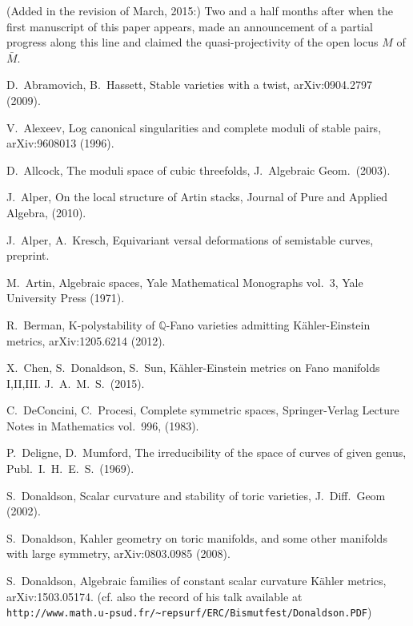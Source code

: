 \documentclass[12pt]{amsart}
\theoremstyle{remark}
\theoremstyle{definition}
\begin{document}
(Added in the revision of March, 2015:) Two and a half 
months after when the first manuscript of this paper 
appears, \cite{LWX2} made an announcement of a partial 
progress along this line and 
claimed the quasi-projectivity of the open locus $M$ of $\bar{M}$. 

\begin{thebibliography}{FGA}

D.~Abramovich, B.~Hassett, 
Stable varieties with a twist, arXiv:0904.2797 (2009). 

V.~Alexeev, Log canonical singularities and complete moduli of stable pairs, 
arXiv:9608013 (1996). 

D.~Allcock, 
The moduli space of cubic threefolds, 
J.\ Algebraic Geom.\ 
(2003). 

J.~Alper, On the local structure of Artin stacks, Journal of Pure and Applied Algebra, 
(2010). 

J.~Alper, A.~Kresch, 
Equivariant versal deformations of semistable curves, 
preprint. 

M.~Artin, Algebraic spaces, 
Yale Mathematical Monographs vol.\ 3, 
Yale University Press (1971). 

R.~Berman, 
K-polystability of $\mathbb{Q}$-Fano varieties admitting 
K\"ahler-Einstein metrics, arXiv:1205.6214 (2012). 

X.~Chen, S.~Donaldson, S.~Sun, 
K\"ahler-Einstein metrics on Fano manifolds I,II,III. 
J.\ A.\ M.\ S.\ (2015). 

C.~DeConcini, C.~Procesi, 
Complete symmetric spaces, Springer-Verlag Lecture Notes in 
Mathematics vol.\ 996, (1983). 

P.~Deligne, D.~Mumford, 
The irreducibility of the space of curves of given genus, 
Publ.\ I.\ H.\ E.\ S.\ (1969). 

S.~Donaldson, Scalar curvature and stability of toric varieties, 
J.\ Diff.\ Geom (2002). 

S.~Donaldson, 
Kahler geometry on toric manifolds, and some other manifolds with large symmetry, 
arXiv:0803.0985 (2008). 

S.~Donaldson, 
Algebraic families of constant scalar curvature K\"{a}hler metrics, arXiv:1503.05174. 
(cf. also the record of his talk available at \\ 
\texttt{http://www.math.u-psud.fr/\~{}repsurf/ERC/Bismutfest/Donaldson.PDF})


\end{thebibliography}
\end{document}
